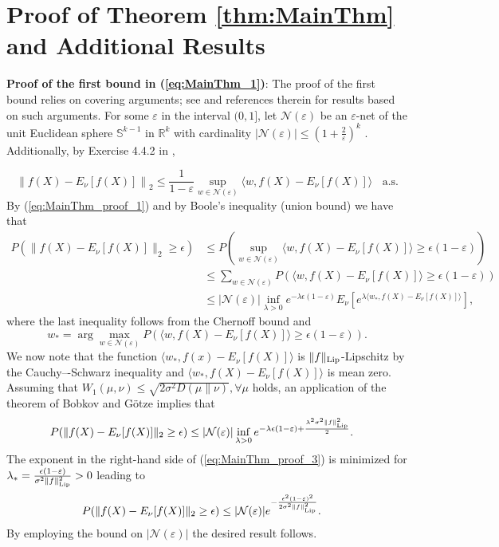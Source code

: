 \documentclass[twoside,11pt]{article}
\begin{document}
\section{Proof of Theorem \ref{thm:MainThm} and Additional Results}
\label{sec:ProofMain}

\noindent\textbf{Proof of the first bound in (\ref{eq:MainThm_1})}: The proof of the first bound relies on covering arguments; see \cite{v18,w19,lc20} and references therein for results based on such arguments.  For some $\varepsilon$ in the interval $(0,1]$, let $\mathcal{N}(\varepsilon)$ be an $\varepsilon$-net of the unit Euclidean  sphere $\mathbb{S}^{k-1}$ in $\mathbb{R}^k$ with cardinality $\left|\mathcal{N}(\varepsilon)\right|\leq \left(1+\frac{2}{\varepsilon}\right)^k$ \cite{v18}. Additionally, by Exercise 4.4.2 in \cite{v18}, 

\begin{equation}\label{eq:MainThm_proof_1}
\left\|f(X)-E_{\nu}[f(X)]\right\|_2\leq \frac{1}{1-\varepsilon}\sup_{w \in \mathcal{N}(\varepsilon)}\langle w, f(X)-E_{\nu}[f(X)] \rangle\ \ \ \ \text{a.s.}
\end{equation}
By (\ref{eq:MainThm_proof_1}) and  by Boole's inequality (union bound) we have that
\begin{align}\label{eq:MainThm_proof_2}
P(\|f(X)-E_{\nu}[f(X)]\|_2\geq \epsilon)&\leq P\left(\sup_{w \in \mathcal{N}(\varepsilon)}\langle w, f(X)-E_{\nu}[f(X)] \rangle \geq \epsilon (1-\varepsilon)\right) \nonumber\\&\leq \sum_{w\in \mathcal{N}(\varepsilon)}P\left(\langle w, f(X)-E_{\nu}[f(X)] \rangle \geq \epsilon (1-\varepsilon)\right)\nonumber\\&\leq |\mathcal{N}(\varepsilon)| \inf_{\lambda>0} e^{-\lambda \epsilon (1-\varepsilon)}E_{\nu}\left[e^{\lambda  \langle w_{*}, f(X)-E_{\nu}[f(X)] \rangle }\right],
\end{align}
where the last inequality follows from the Chernoff bound \cite{rs13} and
\[
w_{*}=\arg\max_{w\in \mathcal{N}(\varepsilon)} P\left(\langle w, f(X)-E_{\nu}[f(X)] \rangle \geq \epsilon (1-\varepsilon)\right).
\] 
We now note that  the function $ \langle w_{*}, f(x)-E_{\nu}[f(X)] \rangle$ is $ \|f\|_{\rm Lip}$-Lipschitz by the  Cauchy–-Schwarz inequality and $ \langle w_{*}, f(X)-E_{\nu}[f(X)] \rangle$ is mean zero.
Assuming that $W_{1}(\mu,\nu)\leq \sqrt{2\sigma^2 D(\mu\|\nu)}, \forall \mu$ holds, an application of the theorem of Bobkov and G\"{o}tze  implies that 
\begin{align}\label{eq:MainThm_proof_3}
P(\|f(X)-E_{\nu}[f(X)]\|_2\geq \epsilon)&\leq |\mathcal{N}(\varepsilon)| \inf_{\lambda>0} e^{-\lambda \epsilon (1-\varepsilon)+\frac{\lambda^2\sigma^2 \|f\|_{\rm Lip}^2}{2}}.
\end{align}
The exponent in the right-hand side of (\ref{eq:MainThm_proof_3}) is minimized for 
$
\lambda_{*}=\frac{\epsilon (1-\varepsilon)}{\sigma^2\|f\|_{\rm Lip}^2}>0
$
leading to 
\begin{align}\label{eq:MainThm_proof_4}
P(\|f(X)-E_{\nu}[f(X)]\|_2\geq \epsilon)&\leq |\mathcal{N}(\varepsilon)| e^{-\frac{\epsilon^2 (1-\varepsilon)^2}{2\sigma^2\|f\|_{\rm Lip}^2}}.
\end{align}
By employing the bound on $|\mathcal{N}(\varepsilon)|$ the desired result follows.
\end{document}
